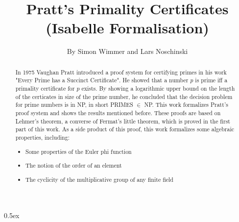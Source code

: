\documentclass[11pt,a4paper]{article}
\begin{document}
\title{Pratt's Primality Certificates \\ (Isabelle Formalisation)}
\author{By Simon Wimmer and Lars Noschinski}
\maketitle

\begin{abstract}
In 1975 Vaughan Pratt introduced a proof system for certifying primes in his work
  "Every Prime has a Succinct Certiﬁcate"\cite{pratt1975certificate}.
  He showed that a number $p$ is prime iff a primality certificate for $p$ exists.
  By showing a logarithmic upper bound on the length of the certicates in size of the prime number,
  he concluded that the decision problem for prime numbers is in NP, in short PRIMES $\in$ NP.
  This work formalizes Pratt's proof system and shows the results mentioned before.  
  These proofs are based on Lehmer's theorem, a converse of Fermat's little theorem,
  which is proved in the first part of this work.
  As a side product of this proof, this work formalizes some algebraic properties, including:
  \begin {itemize}
  \item Some properties of the Euler phi function
  \item The notion of the order of an element
  \item The cyclicity of the multiplicative group of any finite field
  \end {itemize}
\end{abstract}

\tableofcontents

\parindent 0pt\parskip 0.5ex



\nocite{*}



\end{document}
